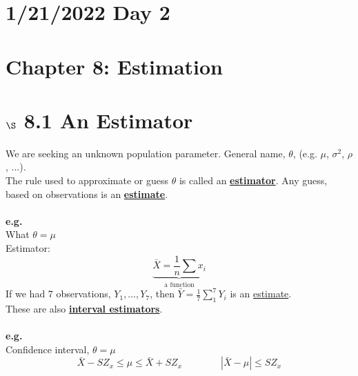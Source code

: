 \documentclass[12pt]{article}
\newcommand{\xbar}{\bar{X}}
\newcommand{\ybar}{\bar{Y}}
\renewcommand{\over}[1]{\frac{1}{{#1}}}
\begin{document}
\section*{1/21/2022 Day 2}
\section*{Chapter 8: Estimation}
\section*{$\S$ 8.1 An Estimator}
We are seeking an unknown population parameter. General name, $\theta$, (e.g. $\mu$, $\sigma^2$, $\rho$, ...).\\
The rule used to approximate or guess $\theta$ is called an \textbf{\underline{estimator}}. Any guess, based on observations is an \textbf{\underline{estimate}}.\\
\\\textbf{e.g.}\\

What $\theta = \mu$\\
Estimator:
$$\underbrace{\xbar = \over{n} \sum x_i}_{\text{a function}}$$
If we had 7 observations, $Y_1, \dots, Y_7$, then
$\ybar = \over{7} \sum_1^7 Y_i$ is an \underline{estimate}.\\
These are also \textbf{\underline{interval estimators}}.
\\\\\textbf{e.g. }\\

Confidence interval, $\theta = \mu$
$$\xbar - SZ_x \leq \mu \leq \xbar + SZ_x \qquad\qquad |\xbar - \mu | \leq SZ_x$$
\vspace{0.3in}
\end{document}
